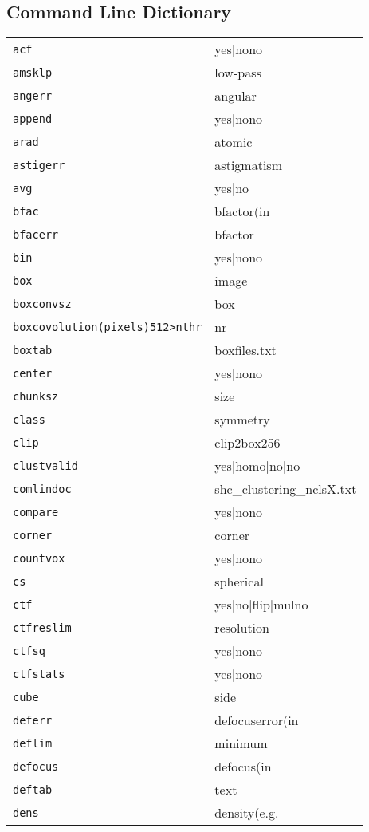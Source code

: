 \subsection{Command Line Dictionary}
\begin{tabular}{ll}
\texttt{acf}&{yes|no{no}}\\
\texttt{amsklp}&{low-pass}\\
\texttt{angerr}&{angular}\\
\texttt{append}&{yes|no{no}}\\
\texttt{arad}&{atomic}\\
\texttt{astigerr}&{astigmatism}\\
\texttt{avg}&{yes|no}\\
\texttt{bfac}&{bfactor(in}\\
\texttt{bfacerr}&{bfactor}\\
\texttt{bin}&{yes|no{no}}\\
\texttt{box}&{image}\\
\texttt{boxconvsz}&{box}\\
\texttt{boxcovolution(pixels){512}>nthr}&{nr}\\
\texttt{boxtab}&{boxfiles.txt}\\
\texttt{center}&{yes|no{no}}\\
\texttt{chunksz}&{size}\\
\texttt{class}&{symmetry}\\
\texttt{clip}&{clip2box{256}}\\
\texttt{clustvalid}&{yes|homo|no|{no}}\\
\texttt{comlindoc}&{shc\_clustering\_nclsX.txt}\\
\texttt{compare}&{yes|no{no}}\\
\texttt{corner}&{corner}\\
\texttt{countvox}&{yes|no{no}}\\
\texttt{cs}&{spherical}\\
\texttt{ctf}&{yes|no|flip|mul{no}}\\
\texttt{ctfreslim}&{resolution}\\
\texttt{ctfsq}&{yes|no{no}}\\
\texttt{ctfstats}&{yes|no{no}}\\
\texttt{cube}&{side}\\
\texttt{deferr}&{defocuserror(in}\\
\texttt{deflim}&{minimum}\\
\texttt{defocus}&{defocus(in}\\
\texttt{deftab}&{text}\\
\texttt{dens}&{density(e.g.}\\

\end{tabular}

